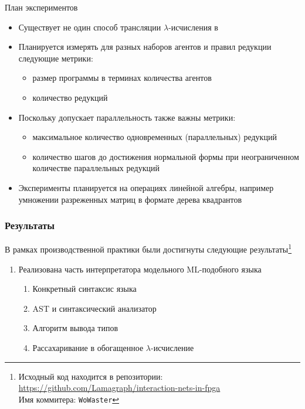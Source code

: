 \documentclass
  [ russian
  , aspectratio=169 %
  ] {beamer}
\begin{document}
\begin{frame}{План экспериментов}
    \begin{itemize}
        \item Существует не один способ трансляции $\lambda$-исчисления в \INs{}
        \item Планируется измерять для разных наборов агентов и правил редукции следующие метрики:
              \begin{itemize}
                  \item размер программы в терминах количества агентов
                  \item количество редукций
              \end{itemize}
        \item Поскольку \INs{} допускает параллельность также важны метрики:
              \begin{itemize}
                  \item максимальное количество одновременных (параллельных) редукций
                  \item количество шагов до достижения нормальной формы при неограниченном количестве параллельных редукций
              \end{itemize}
        \item Эксперименты планируется на операциях линейной алгебры, например умножении разреженных матриц в формате дерева квадрантов
    \end{itemize}
\end{frame}

\begin{frame}
    \frametitle{Результаты}
    В рамках производственной практики были достигнуты следующие результаты\footnote[frame]{Исходный код находится в репозитории: \url{https://github.com/Lamagraph/interaction-nets-in-fpga} \\ Имя коммитера: \texttt{WoWaster}}
    \begin{enumerate}
        \item Реализована часть интерпретатора модельного ML-подобного языка
              \begin{enumerate}
                  \item Конкретный синтаксис языка
                  \item AST и синтаксический анализатор
                  \item Алгоритм вывода типов
                  \item Рассахаривание в обогащенное $\lambda$-исчисление
              \end{enumerate}
    \end{enumerate}
\end{frame}
\end{document}
